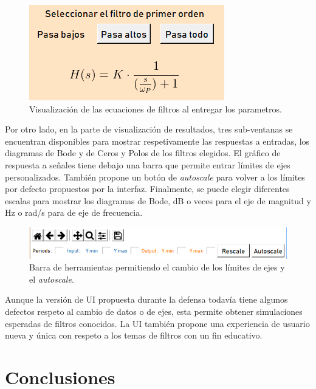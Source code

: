 \documentclass[a4paper]{article}
\begin{document}
\begin{figure}[h]
\begin{center}
\includegraphics[scale=0.6]{EcuacionUI}
\caption{Visualización de las ecuaciones de filtros al entregar los parametros.}
\end{center}
\end{figure}

Por otro lado, en la parte de visualización de resultados, tres sub-ventanas se encuentran disponibles para mostrar respetivamente las respuestas a entradas, los diagramas de Bode y de Ceros y Polos de los filtros elegidos.
El gráfico de respuesta a señales tiene debajo una barra que permite entrar límites de ejes personalizados. También propone un botón de \textit{autoscale} para volver a los límites por defecto propuestos por la interfaz. Finalmente, se puede elegir diferentes escalas para mostrar los diagramas de Bode, dB o veces para el eje de magnitud y Hz o rad/s para de eje de frecuencia.

\begin{figure}[h]
\begin{center}
\includegraphics[scale=0.7]{RescaleUI}
\caption{Barra de herramientas permitiendo el cambio de los límites de ejes y el \textit{autoscale}.}
\end{center}
\end{figure}

Aunque la versión de UI propuesta durante la defensa todavía tiene algunos defectos respeto al cambio de datos o de ejes, esta permite obtener simulaciones esperadas de filtros conocidos. La UI también propone una experiencia de usuario nueva y única con respeto a los temas de filtros con un fin educativo.

\section*{Conclusiones}
\end{document}
